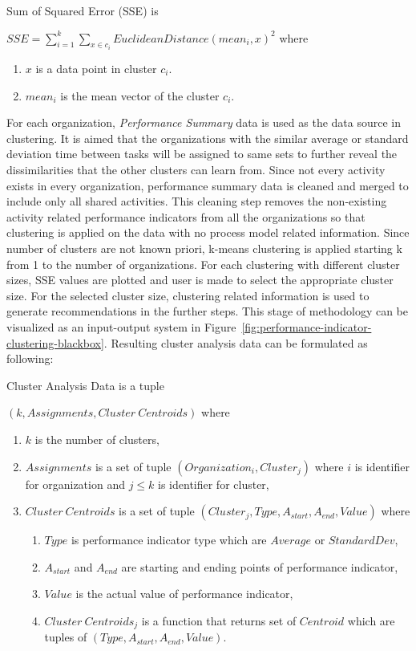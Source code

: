\theoremstyle{definition}
\begin{definition}
Sum of Squared Error (SSE) is

$SSE = \sum_{i=1}^{k} \sum_{x \in c_{i}} EuclideanDistance(mean_{i}, x)^{2}$ where
\begin{enumerate}
  \item $x$ is a data point in cluster $c_{i}$.
  \item $mean_{i}$ is the mean vector of the cluster $c_{i}$.
\end{enumerate}
\end{definition}

For each organization, \textit{Performance Summary} data is used as the data source in clustering. It is aimed that the organizations with the similar average or standard deviation time between tasks will be assigned to same sets to further reveal the dissimilarities that the other clusters can learn from. Since not every activity exists in every organization, performance summary data is cleaned and merged to include only all shared activities. This cleaning step removes the non-existing activity related performance indicators from all the organizations so that clustering is applied on the data with no process model related information. Since number of clusters are not known priori, k-means clustering is applied starting k from 1 to the number of organizations. For each clustering with different cluster sizes, SSE values are plotted and user is made to select the appropriate cluster size. For the selected cluster size, clustering related information is used to generate recommendations in the further steps. This stage of methodology can be visualized as an input-output system in Figure~\ref{fig:performance-indicator-clustering-blackbox}. Resulting cluster analysis data can be formulated as following:

\theoremstyle{definition}
\begin{definition}
Cluster Analysis Data is a tuple 

$(k, Assignments, Cluster\ Centroids)$ where
\begin{enumerate}
	\item $k$ is the number of clusters,
	\item $Assignments$ is a set of tuple $(Organization_{i}, Cluster_{j})$ where $i$ is identifier for organization and $j \leq k$ is identifier for cluster,
	\item $Cluster\ Centroids$ is a set of tuple $(Cluster_{j}, Type, A_{start}, A_{end}, Value)$ where
		\begin{enumerate}
			\item $Type$ is performance indicator type which are $Average$ or $StandardDev$,
			\item $A_{start}$ and $A_{end}$ are starting and ending points of performance indicator,
			\item $Value$ is the actual value of performance indicator,
			\item $Cluster\ Centroids_{j}$ is a function that returns set of $Centroid$ which are tuples of $(Type, A_{start}, A_{end}, Value)$.
		\end{enumerate}	
\end{enumerate}
\end{definition}
 
